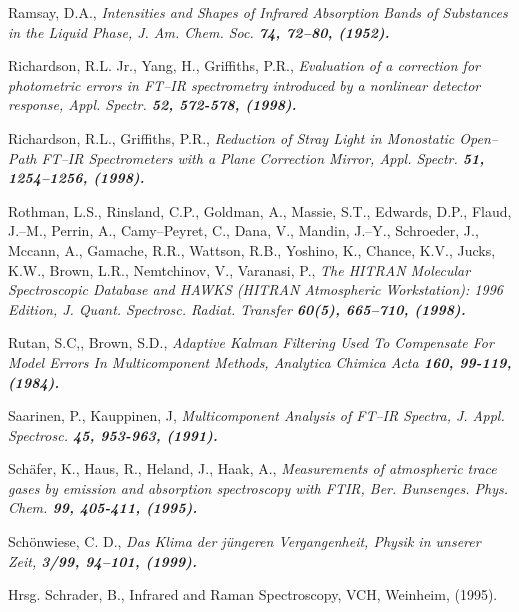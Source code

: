 \begin{thebibliography}{giese-bogdan,199797}

 Ramsay, D.A., \it Intensities and
Shapes of Infrared Absorption Bands of Substances in the Liquid
Phase\rm , J. Am. Chem. Soc. \bf 74\rm , 72--80, (1952).

 Richardson, R.L. Jr., Yang, H., Griffiths, P.R.,
\it Evaluation of a correction for photometric errors in FT--IR
spectrometry introduced by a nonlinear detector response\rm ,
Appl. Spectr. \bf 52\rm , 572-578, (1998).

Richardson, R.L.,
Griffiths, P.R., \it Reduction of Stray Light in Monostatic
Open--Path FT--IR Spectrometers with a Plane Correction Mirror\rm,
Appl. Spectr. \bf 51\rm , 1254--1256, (1998).

 Rothman, L.S., Rinsland, C.P.,
Goldman, A., Massie, S.T., Edwards, D.P., Flaud, J.--M., Perrin,
A., Camy--Peyret, C., Dana, V., Mandin, J.--Y., Schroeder, J.,
Mccann, A., Gamache, R.R., Wattson, R.B., Yoshino, K., Chance,
K.V., Jucks, K.W., Brown, L.R., Nemtchinov, V., Varanasi, P., \it
The HITRAN Molecular Spectroscopic Database and HAWKS (HITRAN
Atmospheric Workstation): 1996 Edition\rm, J. Quant. Spectrosc.
Radiat. Transfer \bf 60(5)\rm, 665--710, (1998).

 Rutan, S.C,, Brown, S.D., \it
Adaptive Kalman Filtering Used To Compensate For Model Errors In
Multicomponent Methods\rm , Analytica Chimica Acta \bf 160\rm ,
99-119, (1984).

 Saarinen, P., Kauppinen, J,
\it Multicomponent Analysis of FT--IR Spectra\rm , J. Appl.
Spectrosc. \bf 45\rm , 953-963, (1991).

 Sch\"{a}fer, K., Haus, R., Heland, J., Haak, A.,
\it Measurements of atmospheric trace gases by emission and
absorption spectroscopy with FTIR\rm , Ber. Bunsenges. Phys. Chem.
\bf 99\rm , 405-411, (1995).

 Sch\"{o}nwiese, C. D., \it
Das Klima der j\"{u}ngeren Vergangenheit\rm , Physik in unserer Zeit,
\bf 3/99\rm , 94--101, (1999).

 Hrsg. Schrader, B., Infrared and
Raman Spectroscopy, VCH, Weinheim, (1995).


\end{thebibliography}

